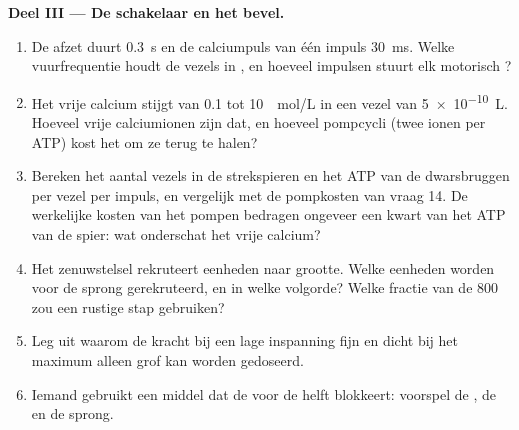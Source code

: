 \begin{problem}
\medskip
\noindent\textbf{Deel III --- De schakelaar en het bevel.}
\begin{enumerate}[resume]
  \item De afzet duurt \qty{0.3}{s} en de calciumpuls van één impuls
        \qty{30}{ms}. Welke vuurfrequentie houdt de vezels in , en
        hoeveel impulsen stuurt elk motorisch ?
  \item Het vrije calcium stijgt van \qty{0.1}{} tot \qty{10}{\micro
        mol/L} in een vezel van \qty{5e-10}{L}. Hoeveel vrije calciumionen
        zijn dat, en hoeveel pompcycli (twee ionen per ATP) kost het om ze
        terug te halen?
  \item Bereken het aantal vezels in de strekspieren en het ATP van de
        dwarsbruggen per vezel per impuls, en vergelijk met de pompkosten van
        vraag 14. De werkelijke kosten van het pompen bedragen ongeveer een
        kwart van het ATP van de spier: wat onderschat het vrije calcium?
  \item Het zenuwstelsel rekruteert eenheden naar grootte. Welke eenheden
        worden voor de sprong gerekruteerd, en in welke volgorde? Welke
        fractie van de \num{800} zou een rustige stap gebruiken?
  \item Leg uit waarom de kracht bij een lage inspanning fijn en dicht bij het
        maximum alleen grof kan worden gedoseerd.
  \item Iemand gebruikt een middel dat de  voor de
        helft blokkeert: voorspel de , de  en
        de sprong.
\end{enumerate}


\end{problem}
